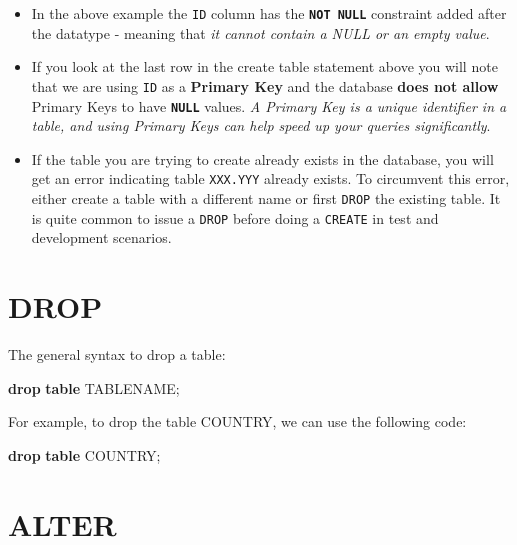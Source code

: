 \documentclass[
]{book}
\newenvironment{Shaded}{\begin{snugshade}}{\end{snugshade}}
\newcommand{\KeywordTok}[1]{\textcolor[rgb]{0.13,0.29,0.53}{\textbf{#1}}}
\newcommand{\NormalTok}[1]{#1}
\begin{document}
\begin{itemize}
\item
  In the above example the \texttt{ID} column has the {\textbf{\texttt{NOT\ NULL}}} constraint added after the datatype - meaning that \emph{it cannot contain a NULL or an empty value}.
\item
  If you look at the last row in the create table statement above you will note that we are using \texttt{ID} as a {\textbf{Primary Key}} and the database \textbf{does not allow} Primary Keys to have \textbf{\texttt{NULL}} values. \emph{A Primary Key is a unique identifier in a table, and using Primary Keys can help speed up your queries significantly}.
\item
  If the table you are trying to create already exists in the database, you will get an error indicating table \texttt{XXX.YYY} already exists. To circumvent this error, either create a table with a different name or first \texttt{DROP} the existing table. It is quite common to issue a \texttt{DROP} before doing a \texttt{CREATE} in test and development scenarios.
\end{itemize}

\hypertarget{drop}{%
\section{DROP}\label{drop}}

The general syntax to drop a table:

\begin{Shaded}
\begin{Highlighting}[]
\KeywordTok{drop} \KeywordTok{table}\NormalTok{ TABLENAME;}
\end{Highlighting}
\end{Shaded}

For example, to drop the table COUNTRY, we can use the following code:

\begin{Shaded}
\begin{Highlighting}[]
\KeywordTok{drop} \KeywordTok{table}\NormalTok{ COUNTRY;}
\end{Highlighting}
\end{Shaded}

\hypertarget{alter}{%
\section{ALTER}\label{alter}}
\end{document}
